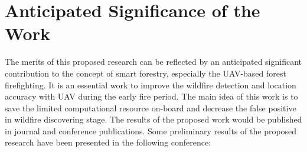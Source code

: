 \section{Anticipated Significance of the Work}
The merits of this proposed research can be reflected by an anticipated significant contribution to the concept of smart forestry, especially the UAV-based forest firefighting. It is an essential work to improve the wildfire detection and location accuracy  with UAV during the early fire period. The main idea of this work is to save the limited computational resource on-board and decrease the false positive in wildfire discovering stage.
The results of the proposed work would be published in journal and conference publications. Some preliminary results of the proposed research have been presented  in the following conference:




